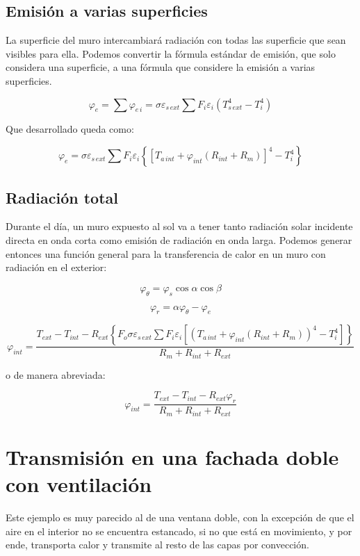 \documentclass[11pt]{article}
\begin{document}
\subsection*{Emisión a varias superficies}

La superficie del muro intercambiará radiación con todas las superficie que sean visibles para ella. Podemos convertir la fórmula estándar de emisión, que solo considera una superficie, a una fórmula que considere la emisión a varias superficies.

\[ \varphi _e = \sum{ \varphi _{ e \, i } } = \sigma \varepsilon _{ s \, ext } \sum{ F_i \varepsilon _i \left( T_{ s \, ext }^4 - T_i^4 \right) } \]

Que desarrollado queda como:

\[ \boxed{ \varphi _e = \sigma \varepsilon _{ s \, ext } \sum{ F_i \varepsilon _i \left\{ \left[ T_{ a \, int } + \varphi _{ int } \left( R_{ int } + R_m \right) \right] ^4 - T_i^4 \right\} } } \]

\subsection{Radiación total}

Durante el día, un muro expuesto al sol va a tener tanto radiación solar incidente directa en onda corta como emisión de radiación en onda larga. Podemos generar entonces una función general para la transferencia de calor en un muro con radiación en el exterior:

\[ \varphi _\theta = \varphi _s \cos \alpha \cos \beta \]

\[ \varphi _r = \alpha \varphi _\theta - \varphi _e \]

\[ \boxed{ \varphi _{ int } = \frac{ T_{ ext} - T_{ int } - R_{ ext } \left\{ F_o \sigma \varepsilon _{ s \, ext } \sum{ F_i \varepsilon _i \left[ \left( T_{ a \, int } + \varphi _{ int } \left( R_{ int } + R_m \right) \right) ^4 - T_i^4 \right] } \right\} }{ R_m + R_{ int } + R_{ ext } } } \]

o de manera abreviada: 

\[ \boxed{ \varphi _{ int } = \frac{ T_{ ext} - T_{ int } - R_{ ext } \varphi _r }{ R_m + R_{ int } + R_{ ext } } } \]

\section{Transmisión en una fachada doble con ventilación}

Este ejemplo es muy parecido al de una ventana doble, con la excepción de que el aire en el interior no se encuentra estancado, si no que está en movimiento, y por ende, transporta calor y transmite al resto de las capas por convección.
\end{document}
